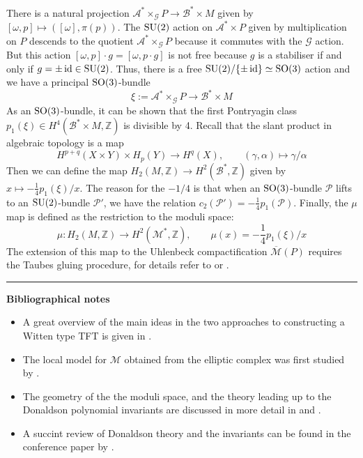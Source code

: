There is a natural projection $\mathcal{A}^* \times_\mathcal{G} P \to
\mathcal{B}^*\times M$ given by $[\omega,p] \mapsto ([\omega],\pi(p))$.
The $\operatorname{SU}(2)$ action on  $\mathcal{A}^*\times P$ given by multiplication on $P$
descends to the quotient $\mathcal{A}^* \times_\mathcal{G} P$ because it 
commutes with the  $\mathcal{G}$ action.
But this action $[\omega,p]\cdot g = [\omega,p\cdot g]$ is not free because 
$g$ is a stabiliser if and only if $g=\pm \operatorname{id}\in \operatorname{SU}(2)$. Thus, there is a free
$\operatorname{SU}(2) /\{\pm\operatorname{id}\} \simeq \operatorname{SO}(3)$ action and we have a principal $\operatorname{SO}(3)$-bundle
\[
\xi := \mathcal{A}^*\times_{\mathcal{G}} P \to \mathcal{B}^*\times M
\] 
As an $\operatorname{SO}(3)$-bundle, it can be shown that the first Pontryagin class
$p_1(\xi) \in H^4(\mathcal{B}^*\times M,\mathbb{Z})$ is divisible by
4.\cite[Lemma 7.2.1]{morgan} 
Recall that the slant product in algebraic topology is a map 
\[
H^{p+q}(X\times Y) \times H_p(Y) \to H^q(X), \qquad 
(\gamma,\alpha) \mapsto \gamma / \alpha
\] 
Then we can define the map $H_2(M,\mathbb{Z})\to H^2(\mathcal{B}^*,\mathbb{Z})$
given by $x \mapsto -\frac{1}{4} p_1(\xi) / x$. The reason for the $-1 /4$ is
that when an $\operatorname{SO}(3)$-bundle $\mathcal{P}$ lifts  to an $\operatorname{SU}(2)$-bundle
$\mathcal{P}'$, we have the relation %
$c_2(\mathcal{P}')=-\frac{1}{4}p_1(\mathcal{P})$. Finally, the $\mu$ map is
defined as the restriction to the moduli space:
 \[
\mu : H_2(M,\mathbb{Z}) \to H^2(\mathcal{M}^*,\mathbb{Z}),\qquad
\mu(x) = -\frac{1}{4}p_1(\xi) /x
\] 
The extension of this map to the Uhlenbeck compactification 
$\overline{\mathcal{M}}(P)$ requires the Taubes
gluing procedure, for details refer to \cite{morgan} or \cite{donaldson_kronheimer}.




\vspace{5mm}
\hrule 
\vspace{5mm}



\textbf{Bibliographical notes}
{\small
\begin{itemize}
	\item A great overview of the main ideas in the two approaches to
		constructing a Witten type TFT is given in \citet{TQFTbook}.
	\item The local model for $\mathcal{M}$ obtained from the elliptic complex 
		was first studied by \citet{local_moduli}.
	\item The geometry of the the moduli space, and the theory leading up to the
		Donaldson polynomial invariants are
		discussed in more detail in \citet{morgan} and
		\citet{donaldson_kronheimer}. 
	\item A succint review of Donaldson theory and the invariants can be found
		in the conference paper by \citet{naber_donaldson}.
\end{itemize}
}
